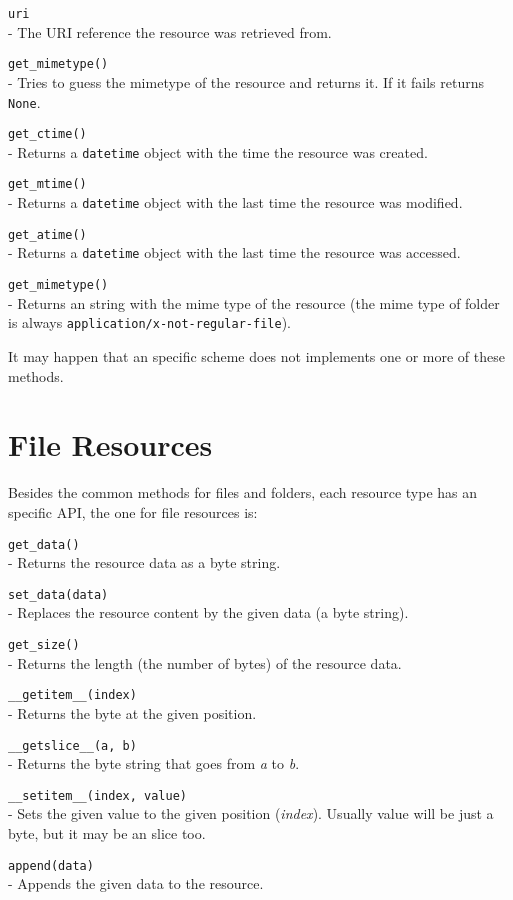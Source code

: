 \begin{api}
  {\tt uri}\\
  - The URI reference the resource was retrieved from.

  {\tt get\_mimetype()}\\
  - Tries to guess the mimetype of the resource and returns it. If it fails
  returns {\tt None}.

  {\tt get\_ctime()}\\
  - Returns a {\tt datetime} object with the time the resource was created.

  {\tt get\_mtime()}\\
  - Returns a {\tt datetime} object with the last time the resource was
    modified.

  {\tt get\_atime()}\\
  - Returns a {\tt datetime} object with the last time the resource was
    accessed.

  {\tt get\_mimetype()}\\
  - Returns an string with the mime type of the resource (the mime type of
    folder is always {\tt application/x-not-regular-file}).
\end{api}

It may happen that an specific scheme does not implements one or more of
these methods.

\section{File Resources}

Besides the common methods for files and folders, each resource type has
an specific API, the one for file resources is:

\begin{api}
  {\tt get\_data()}\\
  - Returns the resource data as a byte string.

  {\tt set\_data(data)}\\
  - Replaces the resource content by the given data (a byte string).

  {\tt get\_size()}\\
  - Returns the length (the number of bytes) of the resource data.

  {\tt \_\_getitem\_\_(index)}\\
  - Returns the byte at the given position.

  {\tt \_\_getslice\_\_(a, b)}\\
  - Returns the byte string that goes from {\em a} to {\em b}.

  {\tt \_\_setitem\_\_(index, value)}\\
  - Sets the given value to the given position ({\em index}). Usually
    value will be just a byte, but it may be an slice too.

  {\tt append(data)}\\
  - Appends the given data to the resource.
\end{api}

